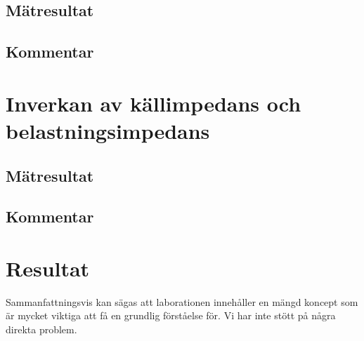 \documentclass[11pt,a4paper]{article}
\begin{document}
\subsection{Mätresultat}\label{}

\subsection{Kommentar}\label{}


\section{Inverkan av källimpedans och belastningsimpedans}\label{}

\subsection{Mätresultat}\label{}

\subsection{Kommentar}\label{}


\section{Resultat}\label{setup}
Sammanfattningsvis kan sägas att laborationen innehåller en mängd koncept som
är mycket viktiga att få en grundlig förståelse för. Vi har inte stött på några
direkta problem.

\newpage

\end{document}
